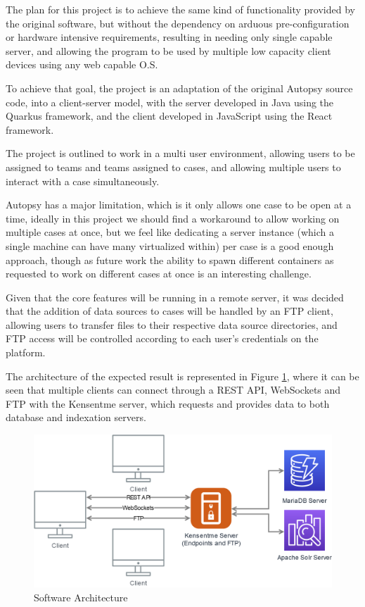 The plan for this project is to achieve the same kind of functionality provided by the original software, but without the dependency on arduous pre-configuration
or hardware intensive requirements, resulting in needing only single capable server, and allowing the program to be used by multiple low capacity client devices using 
any web capable O.S.

To achieve that goal, the project is an adaptation of the original Autopsy source code, into a client-server model, with the server developed in Java using the Quarkus \cite{quarkus} framework,
and the client developed in JavaScript using the React \cite{react} framework.

The project is outlined to work in a multi user environment, allowing users to be assigned to teams and teams assigned to cases, and allowing multiple users to interact with
a case simultaneously.

Autopsy has a major limitation, which is it only allows one case to be open at a time, ideally in this project we should find a workaround to allow working on multiple cases
at once, but we feel like dedicating a server instance (which a single machine can have many virtualized within) per case is a good enough approach, though as future work the
ability to spawn different containers as requested to work on different cases at once is an interesting challenge.

Given that the core features will be running in a remote server, it was decided that the addition of data sources to cases will be handled by an FTP client, allowing users
to transfer files to their respective data source directories, and FTP access will be controlled according to each user's credentials on the platform.

The architecture of the expected result is represented in Figure \ref{fig:arch}, where it can be seen that multiple clients can connect through a REST API, WebSockets and FTP with the Kensentme server, 
which requests and provides data to both database and indexation servers.

\begin{figure}[ht]
 \centering
 \includegraphics[width=0.75\linewidth]{imgs/arch.png}
 \caption{Software Architecture}
 \label{fig:arch}
\end{figure}


